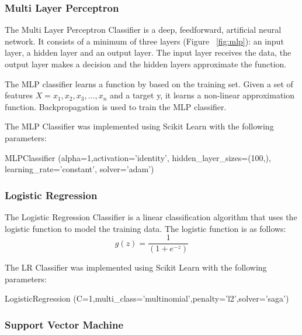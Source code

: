 \subsubsection*{Multi Layer Perceptron}

The Multi Layer Perceptron Classifier is a deep, feedforward, artificial neural network. It consists of a minimum of three layers (Figure ~\ref{fig:mlp}): an input layer, a hidden layer and an output layer. The input layer receives the data, the output layer makes a decision and the hidden layers approximate the function.

The MLP classifier learns a function by based on the training set. Given a set of features $X = x_1,x_2,x_3,...,x_n$ and a target y, it learns a non-linear approximation function. Backpropagation is used to train the MLP classifier.

The MLP Classifier was implemented using Scikit Learn with the following parameters:

\begin{tcolorbox}
\begin{center}
	MLPClassifier (alpha=1,activation='identity', hidden\_layer\_sizes=(100,), learning\_rate='constant', solver='adam')
\end{center}
\end{tcolorbox}

\subsubsection*{Logistic Regression}

The Logistic Regression Classifier is a linear classification algorithm that uses the logistic function to model the training data. The logistic function is as follows:
\begin{equation}
  g(z)= \frac{1}{(1+e^{-z})}  
\end{equation}

The LR Classifier was implemented using Scikit Learn with the following parameters:

\begin{tcolorbox}
\begin{center}
	LogisticRegression (C=1,multi\_class='multinomial',penalty='l2',solver='saga')
\end{center}
\end{tcolorbox}

\subsubsection*{Support Vector Machine}


